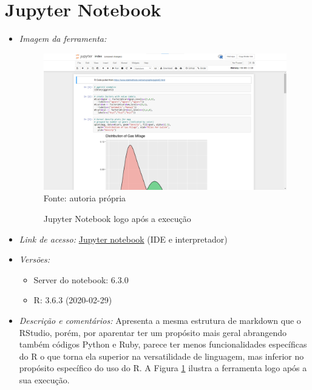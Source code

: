   		\newpage
  \section{Jupyter Notebook}

  \begin{itemize}
  	
  	\item \textit{Imagem da ferramenta:}
  	
  	\begin{figure}[H]  \label{Jupyter_Notebook}
  		\centering
  		\caption{Jupyter Notebook logo após a execução}
  		\includegraphics[width=16cm]{PicturesJoaoDias/Ferramentas/Jupyter Notebook/Jupyter_Notebook-Tela_Inicial.png}
  		{\tiny \sf Fonte: autoria própria}
  	\end{figure}
      \item \textit{Link de acesso:} \href{https://mybinder.org/v2/gh/binder-examples/r/HEAD?filepath=index.ipynb}{Jupyter notebook} (IDE e interpretador)
      \item \textit{Versões:}
      \begin{itemize}
          \item Server do notebook: 6.3.0
          \item R: 3.6.3 (2020-02-29)
      \end{itemize}
      \item \textit{Descrição e comentários:}
        Apresenta a mesma estrutura de markdown que o RStudio, porém, por aparentar ter um propósito mais geral abrangendo também códigos Python e Ruby, parece ter menos funcionalidades específicas do R o que torna ela superior na versatilidade de linguagem, mas inferior no propósito específico do uso do R. A Figura \ref{Jupyter_Notebook} ilustra a ferramenta logo após a sua execução.
        
  \end{itemize}
